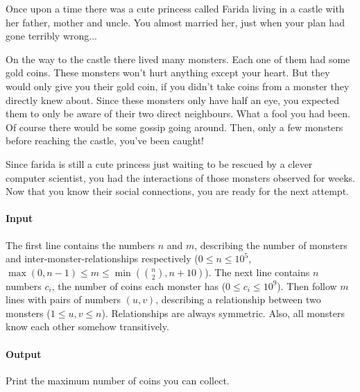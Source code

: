 



\makeheader

Once upon a time there was a cute princess called Farida living in a castle with her father, mother and uncle.
You almost married her, just when your plan had gone terribly wrong...

On the way to the castle there lived many monsters.
Each one of them had some gold coins.
These monsters won't hurt anything except your heart.
But they would only give you their gold coin, if you didn't take coins from a monster they directly knew about.
Since these monsters only have half an eye, you expected them to only be aware of their two direct neighbours.
What a fool you had been.
Of course there would be some gossip going around.
Then, only a few monsters before reaching the castle, you've been caught!

Since farida is still a cute princess just waiting to be rescued by a clever computer scientist, you had the interactions of those monsters observed for weeks.
Now that you know their social connections, you are ready for the next attempt.

\paragraph*{Input}

The first line contains the numbers $n$ and $m$, describing the number of monsters and inter-monster-relationships respectively ($0 \leq n \leq 10^5$, $\max(0, n - 1) \leq m \leq \min(\binom{n}{2}, n + 10)$).
The next line contains $n$ numbers $c_i$, the number of coins each monster has ($0 \leq c_i \leq 10^9$).
Then follow $m$ lines with pairs of numbers $(u, v)$, describing a relationship between two monsters ($1 \leq u, v \leq n$).
Relationships are always symmetric. Also, all monsters know each other somehow transitively.

\paragraph*{Output}

Print the maximum number of coins you can collect.

\begin{samples}
\end{samples}

